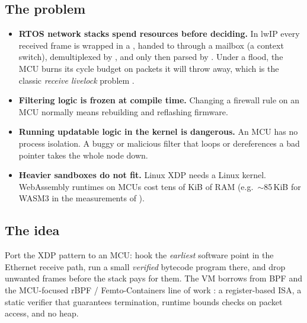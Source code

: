 \documentclass[10pt,a4paper]{article}
\begin{document}
\subsection{The problem}
\begin{itemize}
  \item \textbf{RTOS network stacks spend resources before deciding.} In lwIP every received frame is wrapped in a , handed to  through a mailbox (a context switch), demultiplexed by , and only then parsed by . Under a flood, the MCU burns its cycle budget on packets it will throw away, which is the classic \emph{receive livelock} problem \cite{mogul97}.
  \item \textbf{Filtering logic is frozen at compile time.} Changing a firewall rule on an MCU normally means rebuilding and reflashing firmware.
  \item \textbf{Running updatable logic in the kernel is dangerous.} An MCU has no process isolation. A buggy or malicious filter that loops or dereferences a bad pointer takes the whole node down.
  \item \textbf{Heavier sandboxes do not fit.} Linux XDP needs a Linux kernel. WebAssembly runtimes on MCUs cost tens of KiB of RAM (e.g.\ $\sim$85\,KiB for WASM3 in the measurements of \cite{fc21}).
\end{itemize}

\subsection{The idea}
Port the XDP pattern \cite{xdp18} to an MCU: hook the \emph{earliest} software point in the Ethernet receive path, run a small \emph{verified} bytecode program there, and drop unwanted frames before the stack pays for them. The VM borrows from BPF \cite{bpf93} and the MCU-focused rBPF / Femto-Containers line of work \cite{rbpf20,fc21,fc22}: a register-based ISA, a static verifier that guarantees termination, runtime bounds checks on packet access, and no heap.
\end{document}

